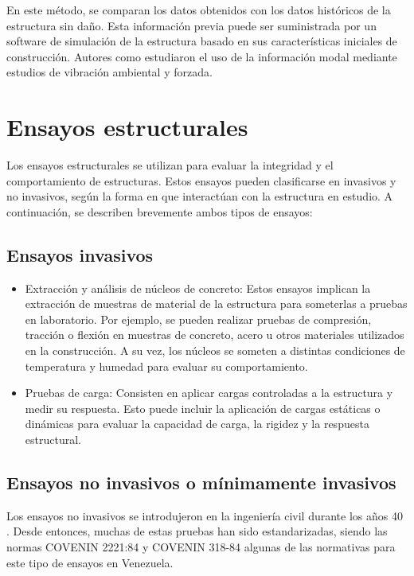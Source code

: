     En este método, se comparan los datos obtenidos con los datos históricos de la estructura sin daño. Esta información previa puede ser suministrada por un software de simulación de la estructura basado en sus características iniciales de construcción. Autores como \cite{fritzen2005vibration} estudiaron el uso de la información modal mediante estudios de vibración ambiental y forzada.

\section{Ensayos estructurales}

Los ensayos estructurales se utilizan para evaluar la integridad y el comportamiento de estructuras. Estos ensayos pueden clasificarse en invasivos y no invasivos, según la forma en que interactúan con la estructura en estudio. A continuación, se describen brevemente ambos tipos de ensayos:

\subsection{Ensayos invasivos}

\begin{itemize}
    \item{Extracción y análisis de núcleos de concreto:} Estos ensayos implican la extracción de muestras de material de la estructura para someterlas a pruebas en laboratorio. Por ejemplo, se pueden realizar pruebas de compresión, tracción o flexión en muestras de concreto, acero u otros materiales utilizados en la construcción. A su vez, los núcleos se someten a distintas condiciones de temperatura y humedad para evaluar su comportamiento.
    \item{Pruebas de carga:} Consisten en aplicar cargas controladas a la estructura y medir su respuesta. Esto puede incluir la aplicación de cargas estáticas o dinámicas para evaluar la capacidad de carga, la rigidez y la respuesta estructural.

\end{itemize}
   
\subsection{Ensayos no invasivos o mínimamente invasivos} 

Los ensayos no invasivos se introdujeron en la ingeniería civil durante los años 40 \citep{mohamed2014}. Desde entonces, muchas de estas pruebas han sido estandarizadas, siendo las normas COVENIN 2221:84 y COVENIN 318-84 algunas de las normativas para este tipo de ensayos en Venezuela. 

